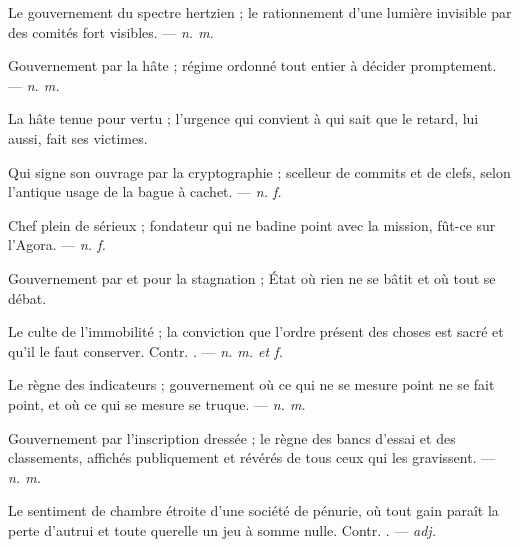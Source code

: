  Le gouvernement du spectre hertzien ; le rationnement d'une lumière invisible par des comités fort visibles. ---  \textit{n. m.}

 Gouvernement par la hâte ; régime ordonné tout entier à décider promptement. ---  \textit{n. m.}

 La hâte tenue pour vertu ; l'urgence qui convient à qui sait que le retard, lui aussi, fait ses victimes.

 Qui signe son ouvrage par la cryptographie ; scelleur de commits et de clefs, selon l'antique usage de la bague à cachet. ---  \textit{n. f.}

 Chef plein de sérieux ; fondateur qui ne badine point avec la mission, fût-ce sur l'Agora. ---  \textit{n. f.}

 Gouvernement par et pour la stagnation ; État où rien ne se bâtit et où tout se débat.

 Le culte de l'immobilité ; la conviction que l'ordre présent des choses est sacré et qu'il le faut conserver. Contr. . ---  \textit{n. m. et f.}

 Le règne des indicateurs ; gouvernement où ce qui ne se mesure point ne se fait point, et où ce qui se mesure se truque. ---  \textit{n. m.}

 Gouvernement par l'inscription dressée ; le règne des bancs d'essai et des classements, affichés publiquement et révérés de tous ceux qui les gravissent. ---  \textit{n. m.}

 Le sentiment de chambre étroite d'une société de pénurie, où tout gain paraît la perte d'autrui et toute querelle un jeu à somme nulle. Contr. . ---  \textit{adj.}

